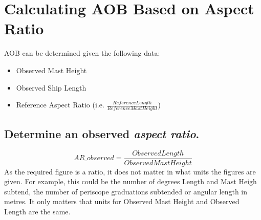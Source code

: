\documentclass{article}
\begin{document}





\section{Calculating AOB Based on Aspect Ratio}


AOB can be determined given the following data:
\begin{itemize}
\item{Observed Mast Height}
\item{Observed Ship Length}
\item{Reference Aspect Ratio (i.e. $\frac{Reference Length}{Reference Mast Height}$)}
\end{itemize}

\subsection{Determine an observed \emph{aspect ratio}.}
$$AR\_{observed} = \frac{Observed Length}{Observed Mast Height}$$
As the required figure is a ratio, it does not matter in what units the figures are given. For example, this could be the number of degrees Length and Mast Heigh subtend, the number of periscope graduations subtended or angular length in metres. It only matters that units for Observed Mast Height and Observed Length are the same.
\end{document}
